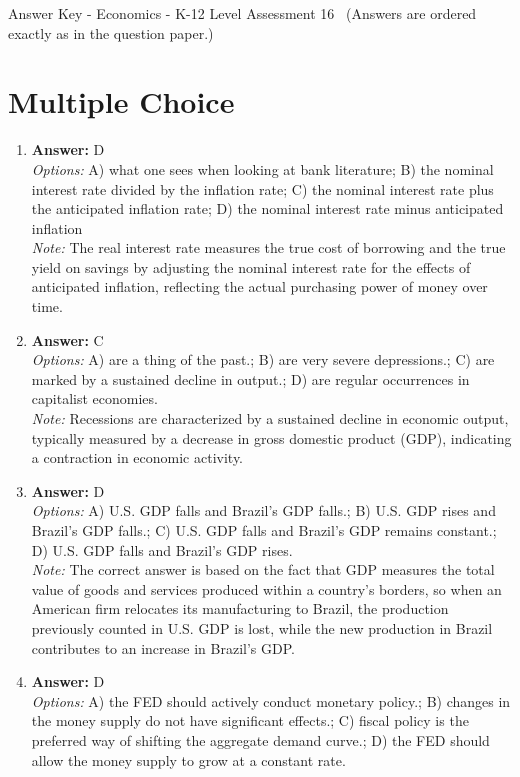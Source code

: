 \documentclass[12pt]{article}
\begin{document}
\begin{center}
Answer Key - Economics - K-12 Level Assessment 16 \
\small (Answers are ordered exactly as in the question paper.)
\end{center}

\section*{Multiple Choice}
\begin{enumerate}[label=\arabic*.]
\item \textbf{Answer:} D
\\ \textit{Options:} A) what one sees when looking at bank literature; B) the nominal interest rate divided by the inflation rate; C) the nominal interest rate plus the anticipated inflation rate; D) the nominal interest rate minus anticipated inflation
\\ \textit{Note:} The real interest rate measures the true cost of borrowing and the true yield on savings by adjusting the nominal interest rate for the effects of anticipated inflation, reflecting the actual purchasing power of money over time.
\item \textbf{Answer:} C
\\ \textit{Options:} A) are a thing of the past.; B) are very severe depressions.; C) are marked by a sustained decline in output.; D) are regular occurrences in capitalist economies.
\\ \textit{Note:} Recessions are characterized by a sustained decline in economic output, typically measured by a decrease in gross domestic product (GDP), indicating a contraction in economic activity.
\item \textbf{Answer:} D
\\ \textit{Options:} A) U.S. GDP falls and Brazil's GDP falls.; B) U.S. GDP rises and Brazil's GDP falls.; C) U.S. GDP falls and Brazil's GDP remains constant.; D) U.S. GDP falls and Brazil's GDP rises.
\\ \textit{Note:} The correct answer is based on the fact that GDP measures the total value of goods and services produced within a country's borders, so when an American firm relocates its manufacturing to Brazil, the production previously counted in U.S. GDP is lost, while the new production in Brazil contributes to an increase in Brazil's GDP.
\item \textbf{Answer:} D
\\ \textit{Options:} A) the FED should actively conduct monetary policy.; B) changes in the money supply do not have significant effects.; C) fiscal policy is the preferred way of shifting the aggregate demand curve.; D) the FED should allow the money supply to grow at a constant rate.

\end{enumerate}
\end{document}
